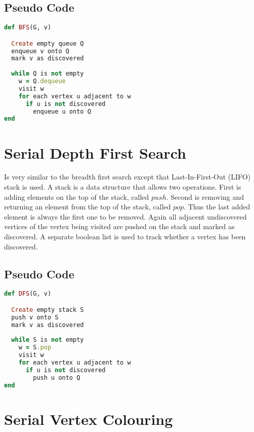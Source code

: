 \documentclass{report}
\theoremstyle{plain}
\theoremstyle{definition}
\theoremstyle{remark}
\begin{document}
\subsection*{Pseudo Code}

\begin{lstlisting}[language=Ruby]
def BFS(G, v)

  Create empty queue Q
  enqueue v onto Q
  mark v as discovered
  
  while Q is not empty
    w = Q.dequeue
    visit w
    for each vertex u adjacent to w
      if u is not discovered
        enqueue u onto Q
end
\end{lstlisting}

\section{Serial Depth First Search}

Is very similar to the breadth first search except that Last-In-First-Out (LIFO) stack is used. A stack is a data structure that allows two operations. First is adding elements on the top of the stack, called $push$. Second is removing and returning an element from the top of the stack, called $pop$. Thus the last added element is always the first one to be removed. Again all adjacent undiscovered vertices of the vertex being visited are pushed on the stack and marked as discovered. A separate boolean list is used to track whether a vertex has been discovered.

\subsection*{Pseudo Code}

\begin{lstlisting}[language=Ruby]
def DFS(G, v)

  Create empty stack S
  push v onto S
  mark v as discovered
  
  while S is not empty
    w = S.pop
    visit w
    for each vertex u adjacent to w
      if u is not discovered
        push u onto Q
end
\end{lstlisting}

\section{Serial Vertex Colouring}
\end{document}
